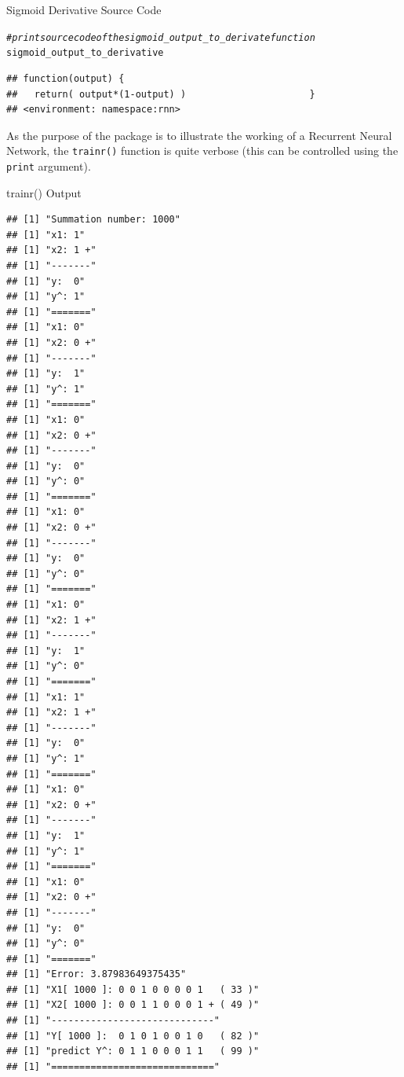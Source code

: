 \documentclass[british]{article}\usepackage[]{graphicx}\usepackage[]{color}
\makeatletter
\newcommand{\hlcom}[1]{\textcolor[rgb]{0.678,0.584,0.686}{\textit{#1}}}%
\newcommand{\hlstd}[1]{\textcolor[rgb]{0.345,0.345,0.345}{#1}}%
\newenvironment{kframe}{%
 \def\at@end@of@kframe{}%
 \ifinner\ifhmode%
  \def\at@end@of@kframe{\end{minipage}}%
  \begin{minipage}{\columnwidth}%
 \fi\fi%
 \def\FrameCommand##1{\hskip\@totalleftmargin \hskip-\fboxsep
 \colorbox{shadecolor}{##1}\hskip-\fboxsep
     \hskip-\linewidth \hskip-\@totalleftmargin \hskip\columnwidth}%
 \MakeFramed {\advance\hsize-\width
   \@totalleftmargin\z@ \linewidth\hsize
   \@setminipage}}%
 {\par\unskip\endMakeFramed%
 \at@end@of@kframe}
\newenvironment{knitrout}{}{} %
\newcommand{\code}[1]{\texttt{#1}}
\makeatother
\begin{document}
\begin{table}[H]


\caption{Sigmoid Derivative Source Code}


\begin{knitrout}
\color{fgcolor}\begin{kframe}
\begin{alltt}
\hlcom{# print source code of the sigmoid_output_to_derivate function}
\hlstd{sigmoid_output_to_derivative}
\end{alltt}
\begin{verbatim}
## function(output) {
##   return( output*(1-output) )                      }
## <environment: namespace:rnn>
\end{verbatim}
\end{kframe}
\end{knitrout}

\end{table}


As the purpose of the package is to illustrate the working of a Recurrent
Neural Network, the \code{trainr()} function is quite verbose (this
can be controlled using the \code{print} argument).

\begin{table}[H]


\caption{trainr() Output}


\begin{knitrout}\tiny
{}\color{fgcolor}\begin{kframe}
\begin{verbatim}
## [1] "Summation number: 1000"
## [1] "x1: 1"
## [1] "x2: 1 +"
## [1] "-------"
## [1] "y:  0"
## [1] "y^: 1"
## [1] "======="
## [1] "x1: 0"
## [1] "x2: 0 +"
## [1] "-------"
## [1] "y:  1"
## [1] "y^: 1"
## [1] "======="
## [1] "x1: 0"
## [1] "x2: 0 +"
## [1] "-------"
## [1] "y:  0"
## [1] "y^: 0"
## [1] "======="
## [1] "x1: 0"
## [1] "x2: 0 +"
## [1] "-------"
## [1] "y:  0"
## [1] "y^: 0"
## [1] "======="
## [1] "x1: 0"
## [1] "x2: 1 +"
## [1] "-------"
## [1] "y:  1"
## [1] "y^: 0"
## [1] "======="
## [1] "x1: 1"
## [1] "x2: 1 +"
## [1] "-------"
## [1] "y:  0"
## [1] "y^: 1"
## [1] "======="
## [1] "x1: 0"
## [1] "x2: 0 +"
## [1] "-------"
## [1] "y:  1"
## [1] "y^: 1"
## [1] "======="
## [1] "x1: 0"
## [1] "x2: 0 +"
## [1] "-------"
## [1] "y:  0"
## [1] "y^: 0"
## [1] "======="
## [1] "Error: 3.87983649375435"
## [1] "X1[ 1000 ]: 0 0 1 0 0 0 0 1   ( 33 )"
## [1] "X2[ 1000 ]: 0 0 1 1 0 0 0 1 + ( 49 )"
## [1] "-----------------------------"
## [1] "Y[ 1000 ]:  0 1 0 1 0 0 1 0   ( 82 )"
## [1] "predict Y^: 0 1 1 0 0 0 1 1   ( 99 )"
## [1] "============================="
\end{verbatim}
\end{kframe}
\end{knitrout}

\end{table}
\end{document}
